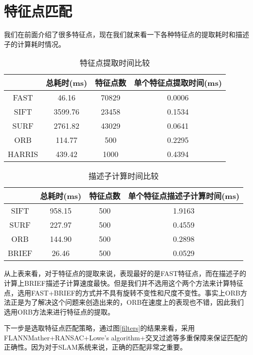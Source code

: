 \section{特征点匹配}
我们在前面介绍了很多特征点，现在我们就来看一下各种特征点的提取耗时和描述子的计算耗时情况。
\begin{table}[htbp]
	\centering
	\caption{特征点提取时间比较}
	\begin{tabular}{cccc}
		\toprule
		& 总耗时(ms) & 特征点数  & 单个特征点提取时间(ms) \\ \midrule
		FAST   & 46.16   & 70829 & 0.0006        \\ \hline
		SIFT   & 3599.76 & 23458 & 0.1534        \\ \hline
		SURF   & 2761.82 & 43029 & 0.0641        \\ \hline
		ORB    & 114.77  & 500   & 0.2295        \\ \hline
		HARRIS & 439.42  & 1000  & 0.4394      	\\ \bottomrule
	\end{tabular}
\end{table}\par

\begin{table}[]
	\centering
	\caption{描述子计算时间比较}
	\begin{tabular}{cccc}
		\toprule
		& 总耗时(ms) & 特征点数 & 单个特征点描述子计算时间(ms) \\ \midrule
		SIFT  & 958.15  & 500  & 1.9163           \\ \hline
		SURF  & 227.97  & 500  & 0.4559           \\ \hline
		ORB   & 144.90  & 500  & 0.2898           \\ \hline
		BRIEF & 26.46   & 500  & 0.0529          \\ \bottomrule
	\end{tabular}
\end{table}
从上表来看，对于特征点的提取来说，表现最好的是FAST特征点，而在描述子的计算上BRIEF描述子计算速度最快。但是我们并不选用这个两个方法来计算特征点，选用FAST+BRIEF的方式并不具有旋转不变性和尺度不变性。事实上ORB方法正是为了解决这个问题来创造出来的，ORB在速度上的表现也不错，因此我们选用ORB方法来进行特征点的提取。\par
下一步是选取特征点匹配策略，通过图\ref{filters}的结果来看，采用FLANNMather+RANSAC+Lowe's algorithm+交叉过滤等多重保障来保证匹配的正确性。因为对于SLAM系统来说，正确的匹配非常之重要。
